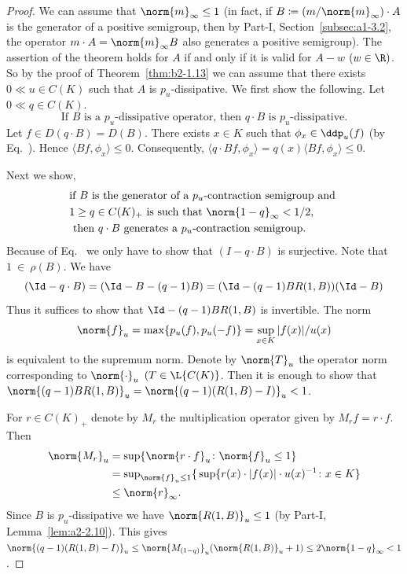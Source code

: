 \begin{proof}
We can assume that $\norm{m}_{\infty} \leq 1$ (in fact, if\/ $B \coloneqq (m/\norm{m}_{\infty}) \cdot A$ is the generator of a positive semigroup, then by 
Part-I, Section~\ref{subsec:a1-3.2}, the operator $m \cdot A = \norm{m}_{\infty}B$ also generates a positive semigroup).
The assertion of the theorem holds for $A$ if and only if it is valid for $A - w$ $(w \in \R)$.
So by the proof of Theorem~\ref{thm:b2-1.13} we can assume that there exists $0 \ll u \in C(K)$ such that $A$ is $p_{u}$-dissipative.
We first show the following. Let $0 \ll q \in C(K)$.
\begin{equation}\label{eq:b2-1.11}
\text{If } B \text{ is a } p_{u}\text{-dissipative operator, then } q \cdot B \text{ is } p_{u}\text{-dissipative.}
\end{equation}
Let $f \in D(q \cdot B) = D(B)$.
There exists $x \in K$ such that $\phi_{x} \in \ddp_{u}(f)$ (by Eq.~). 
Hence $\langle Bf,\phi_{x} \rangle \leq 0$.
Consequently, $\langle q \cdot Bf,\phi_{x} \rangle = q(x)\langle Bf,\phi_{x} \rangle \leq 0$.

Next we show,
\begin{equation}\label{eq:b2-1.12}
\begin{split}
&\text{if } B \text{ is the generator of a } p_{u}\text{-contraction semigroup and } \\
&1 \geq q \in C(K)_{+} \text{ is such that } \norm{1 - q}_{\infty} < 1/2,  \\
&\text{ then } q \cdot B \text{ generates a } p_{u}\text{-contraction semigroup.}
\end{split}
\end{equation}
Because of Eq.~ we only have to show that $(I - q \cdot B)$ is surjective. 
Note that $1~\in~\rho(B)$.
We have 
\[( \Id - q \cdot B) = (\Id - B - (q-1)B) = (\Id - (q-1)BR(1,B))(\Id - B)
\]
Thus it suffices to show that $\Id - (q-1)BR(1,B)$ is invertible.
The norm 
\[
\norm{f}_{u} = \max\{p_{u}(f), p_{u}(-f)\} = \sup_{x \in K} |f(x)|/u(x)
\]
is equivalent to the supremum norm.
Denote by $\norm{T}_{u}$ the operator norm corresponding to $\norm{\cdot}_{u}$ $(T \in \L{C(K)}$.
Then it is enough to show that $\norm{(q-1)BR(1,B)}_{u} = \norm{(q-1)(R(1,B) - I)}_{u} < 1$.

For $r \in C(K)_{+}$ denote by $M_{r}$ the multiplication operator given by $M_{r}f = r \cdot f$.
Then 
\begin{align*}
	    \norm{M_{r}}_{u} &= \sup\{\norm{r \cdot f}_{u} \colon \norm{f}_{u} \leq 1\} \\
	              &= \sup\nolimits_{\norm{f}_{u} \leq 1}\{ \, 
	              \sup \{ r(x) \cdot |f(x)| \cdot u(x)^{-1}  \colon {x \in K} \}  \\
	              &\leq \norm{r}_{\infty}.
\end{align*}
Since $B$ is $p_{u}$-dissipative we have $\norm{R(1,B)}_{u} \leq 1$ (by Part-I, Lemma~\ref{lem:a2-2.10}).
This gives $\norm{(q-1)(R(1,B) - I)}_{u} \leq \norm{M_{(1-q)}}_{u}(\norm{R(1,B)}_{u} + 1) \leq 2\norm{1 - q}_{\infty} < 1$.


\end{proof}
